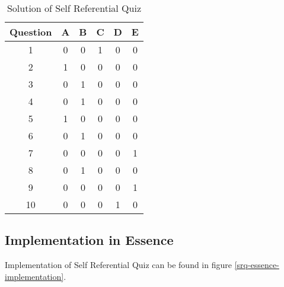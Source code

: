 \begin{table}[ht]
\caption{\label{srq-solution-table}Solution of Self Referential Quiz}
\begin{center}
\begin{tabular}{|c|c|c|c|c|c|}
\hline Question & A & B & C & D & E \\
\hline\hline 1 & 0 & 0 & 1 & 0 & 0 \\
\hline 2 & 1 & 0 & 0 & 0 & 0 \\
\hline 3 & 0 & 1 & 0 & 0 & 0 \\
\hline 4 & 0 & 1 & 0 & 0 & 0 \\
\hline 5 & 1 & 0 & 0 & 0 & 0 \\
\hline 6 & 0 & 1 & 0 & 0 & 0 \\
\hline 7 & 0 & 0 & 0 & 0 & 1 \\
\hline 8 & 0 & 1 & 0 & 0 & 0 \\
\hline 9 & 0 & 0 & 0 & 0 & 1 \\
\hline 10 & 0 & 0 & 0 & 1 & 0 \\
\hline 
\end{tabular}
\end{center}
\end{table}

\subsection{Implementation in Essence}
Implementation of Self Referential Quiz can be found in figure \ref{srq-essence-implementation}.



\lstset{         %
  language=C++,
	basicstyle=\tiny,
  keywordstyle=\bfseries,
  identifierstyle=\itshape,
  stringstyle=\ttfamily,
  numbers=none,
  numberstyle=\tiny,
  numbersep=5pt,
  frameround=ffff,
  extendedchars=true,
  tab=~,
  tabsize=2,
  frame=single,
  captionpos=b,
  showspaces=false,
  showstringspaces=false,
  breaklines=true
}


